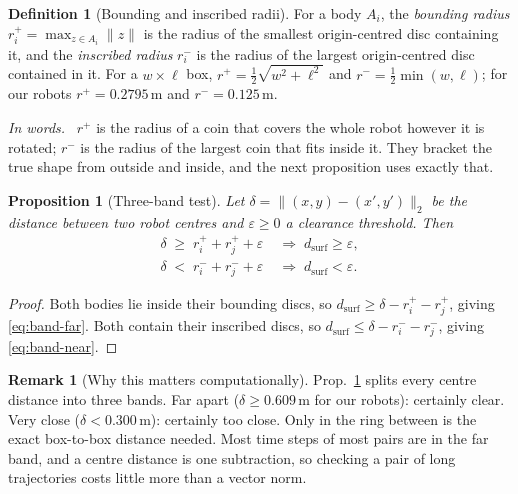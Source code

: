 \documentclass[conference]{IEEEtran}
\theoremstyle{plain}
\newtheorem{proposition}{Proposition}
\theoremstyle{definition}
\newtheorem{definition}{Definition}
\newtheorem{remark}{Remark}
\newcommand{\inwords}{\par\smallskip\noindent\textit{In words.}\ }
\newcommand{\clr}{\varepsilon}
\begin{document}
\begin{definition}[Bounding and inscribed radii]
For a body $A_i$, the \emph{bounding radius} $r^{+}_i = \max_{z \in A_i}\lVert z\rVert$ is
the radius of the smallest origin-centred disc containing it, and the \emph{inscribed
radius} $r^{-}_i$ is the radius of the largest origin-centred disc contained in it. For a
$w \times \ell$ box, $r^{+} = \tfrac12\sqrt{w^2+\ell^2}$ and $r^{-} = \tfrac12\min(w,\ell)$;
for our robots $r^{+} = 0.2795$\,m and $r^{-} = 0.125$\,m.
\inwords
$r^{+}$ is the radius of a coin that covers the whole robot however it is rotated;
$r^{-}$ is the radius of the largest coin that fits inside it. They bracket the true shape
from outside and inside, and the next proposition uses exactly that.
\end{definition}

\begin{proposition}[Three-band test]
\label{prop:bands}
Let $\delta = \lVert (x,y) - (x',y') \rVert_2$ be the distance between two robot centres and
$\clr \ge 0$ a clearance threshold. Then
\begin{align}
  \delta \;\ge\; r^{+}_i + r^{+}_j + \clr
    &\;\Longrightarrow\; d_{\text{surf}} \ge \clr, \label{eq:band-far}\\
  \delta \;<\; r^{-}_i + r^{-}_j + \clr
    &\;\Longrightarrow\; d_{\text{surf}} < \clr. \label{eq:band-near}
\end{align}
\end{proposition}

\begin{proof}
Both bodies lie inside their bounding discs, so
$d_{\text{surf}} \ge \delta - r^{+}_i - r^{+}_j$, giving \eqref{eq:band-far}. Both contain
their inscribed discs, so $d_{\text{surf}} \le \delta - r^{-}_i - r^{-}_j$, giving
\eqref{eq:band-near}.
\end{proof}

\begin{remark}[Why this matters computationally]
Prop.~\ref{prop:bands} splits every centre distance into three bands. Far apart
($\delta \ge 0.609$\,m for our robots): certainly clear. Very close ($\delta < 0.300$\,m):
certainly too close. Only in the ring between is the exact box-to-box distance needed. Most
time steps of most pairs are in the far band, and a centre distance is one subtraction, so
checking a pair of long trajectories costs little more than a vector norm.
\end{remark}
\end{document}
